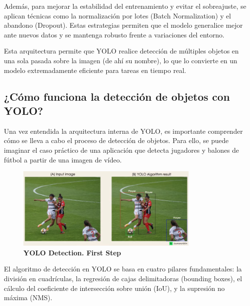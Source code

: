 \documentclass[12pt, a4paper, twoside]{article}
\begin{document}
	Además, para mejorar la estabilidad del entrenamiento y evitar el sobreajuste, se aplican técnicas como la normalización por lotes (Batch Normalization) y el abandono (Dropout). Estas estrategias permiten que el modelo generalice mejor ante nuevos datos y se mantenga robusto frente a variaciones del entorno.
	
	Esta arquitectura permite que YOLO realice detección de múltiples objetos en una sola pasada sobre la imagen (de ahí su nombre), lo que lo convierte en un modelo extremadamente eficiente para tareas en tiempo real.
	
	\subsection{¿Cómo funciona la detección de objetos con YOLO?}
	
	Una vez entendida la arquitectura interna de YOLO, es importante comprender cómo se lleva a cabo el proceso de detección de objetos. Para ello, se puede imaginar el caso práctico de una aplicación que detecta jugadores y balones de fútbol a partir de una imagen de vídeo.
	
	\begin{figure}[H]
		\centering
		\includegraphics[width=0.8\textwidth]{image/yolodec1}
		\caption{\textbf{YOLO Detection. First Step}}
		\label{fig:YOLO Detection. First Step}
	\end{figure}
	
	El algoritmo de detección en YOLO se basa en cuatro pilares fundamentales: la división en cuadrículas, la regresión de cajas delimitadoras (bounding boxes), el cálculo del coeficiente de intersección sobre unión (IoU), y la supresión no máxima (NMS).
	
\end{document}
